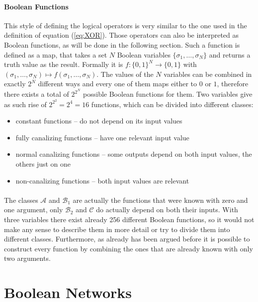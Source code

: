 \paragraph*{Boolean Functions}\label{sec:binary_logic}
This style of defining the logical operators is very similar to the one used in the definition of equation (\ref{eq:XOR}). Those operators can also be interpreted as Boolean functions, as will be done in the following section. Such a function is defined as a map, that takes a set $ N $ Boolean variables $ \{\sigma_1,\dots , \sigma_N\} $ and returns a truth value as the result. Formally it is $ f:\{0,1\}^N \longrightarrow \{0,1\} $ with $ ( \sigma_1 , \dots , \sigma_N ) \mapsto f( \sigma_1 , \dots , \sigma_N )$. The values of the $ N $ variables can be combined in exactly $ 2^N $ different ways and every one of them maps either to $ 0 $ or $ 1 $, therefore there exists a total of $ 2^{2^N} $ possible Boolean functions for them. Two variables give as such rise of $2^{2^2}=2^4= 16 $ functions, which can be divided into different classes:
\begin{itemize}
	\item[$ \mathcal{A} $\ ] constant functions -- do not depend on its input values
	\item[$ \mathcal{B}_1 $] fully canalizing functions -- have one relevant input value
	\item[$ \mathcal{B}_2 $]  normal canalizing functions -- some outputs depend on both input values, the others just on one
	\item[$ \mathcal{C} $\ ] non-canalizing functions -- both input values are relevant
\end{itemize}

\paragraph*{}
The classes $ \mathcal{A} $ and $ \mathcal{B}_1 $ are actually the functions that were known with zero and one argument, only  $ \mathcal{B}_2 $ and  $ \mathcal{C} $ do actually depend on both their inputs. With three variables there exist already 256 different Boolean functions, so it would not make any sense to describe them in more detail or try to divide them into different classes. Furthermore, as already has been argued before it is possible to construct every function by combining the ones that are already known with only two arguments.

\section{Boolean Networks}
